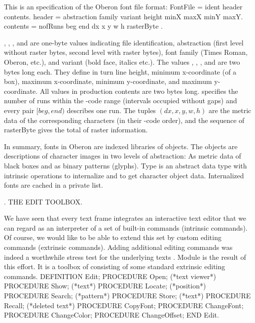 This is an  specification of the Oberon font file format:
\begintt
FontFile = ident header contents.
header = abstraction family variant height minX maxX minY maxY.
contents = nofRuns { beg end } { dx x y w h } { rasterByte }.
\endtt

\noindent {}, , , and  are one-byte values indicating file identification, abstraction (first level without raster bytes, second level with raster bytes), font family (Times Roman, Oberon, etc.), and variant (bold face, italics etc.). The values , , ,  and  are two bytes long each. They define in turn line height, minimum x-coordinate (of a box), maximum x-coordinate, minimum y-coordinate, and maximum y-coordinate. All values in production contents are two bytes long.  specifies the number of runs within the -code range (intervals occupied without gaps) and every pair $[beg, end)$ describes one run. The tuples $(dx, x, y, w, h)$ are the metric data of the corresponding characters (in their -code order), and the sequence of rasterByte gives the total of raster information.

In summary, fonts in Oberon are indexed libraries of objects. The objects are descriptions of character images in two levels of abstraction: As metric data of black boxes and as binary patterns (glyphs). Type  is an abstract data type with intrinsic operations to internalize and to get character object data. Internalized fonts are cached in a private list.

. THE EDIT TOOLBOX.

We have seen that every text frame integrates an interactive text editor that we can regard as an interpreter of a set of built-in commands (intrinsic commands). Of course, we would like to be able to extend this set by custom editing commands (extrinsic commands). Adding additional editing commands was indeed a worthwhile stress test for the underlying texts . Module  is the result of this effort. It is a toolbox of consisting of some standard extrinsic editing commands.
\begintt
DEFINITION Edit;
PROCEDURE Open; (*text viewer*)
PROCEDURE Show; (*text*)
PROCEDURE Locate; (*position*)
PROCEDURE Search; (*pattern*)
PROCEDURE Store; (*text*)
PROCEDURE Recall; (*deleted text*)
PROCEDURE CopyFont;
PROCEDURE ChangeFont;
PROCEDURE ChangeColor;
PROCEDURE ChangeOffset;
END Edit.
\endtt


